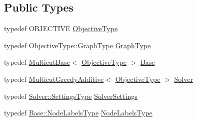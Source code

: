 \subsection*{Public Types}
\begin{DoxyCompactItemize}
\item 
typedef O\+B\+J\+E\+C\+T\+I\+VE \hyperlink{classnifty_1_1graph_1_1opt_1_1multicut_1_1GreedyAdditiveProposals_a8b28464e490d224a3626680692ac2170}{Objective\+Type}
\item 
typedef Objective\+Type\+::\+Graph\+Type \hyperlink{classnifty_1_1graph_1_1opt_1_1multicut_1_1GreedyAdditiveProposals_a059ec39cbdde7294a76dac00d102e209}{Graph\+Type}
\item 
typedef \hyperlink{classnifty_1_1graph_1_1opt_1_1multicut_1_1MulticutBase}{Multicut\+Base}$<$ \hyperlink{classnifty_1_1graph_1_1opt_1_1multicut_1_1GreedyAdditiveProposals_a8b28464e490d224a3626680692ac2170}{Objective\+Type} $>$ \hyperlink{classnifty_1_1graph_1_1opt_1_1multicut_1_1GreedyAdditiveProposals_a058a440d88f840a245fdc792d47611d5}{Base}
\item 
typedef \hyperlink{classnifty_1_1graph_1_1opt_1_1multicut_1_1MulticutGreedyAdditive}{Multicut\+Greedy\+Additive}$<$ \hyperlink{classnifty_1_1graph_1_1opt_1_1multicut_1_1GreedyAdditiveProposals_a8b28464e490d224a3626680692ac2170}{Objective\+Type} $>$ \hyperlink{classnifty_1_1graph_1_1opt_1_1multicut_1_1GreedyAdditiveProposals_a436b21c4ce1d95f27c50cf7aa9b41b1f}{Solver}
\item 
typedef \hyperlink{classnifty_1_1graph_1_1opt_1_1multicut_1_1MulticutGreedyAdditive_a074ee39f5884cff7359f5c0997929e2f}{Solver\+::\+Settings\+Type} \hyperlink{classnifty_1_1graph_1_1opt_1_1multicut_1_1GreedyAdditiveProposals_a7612d756b6f63b2cda337c3d1a0fa4c9}{Solver\+Settings}
\item 
typedef \hyperlink{classnifty_1_1graph_1_1opt_1_1common_1_1SolverBase_abefd51561de2fd009f6bed6bef6009ea}{Base\+::\+Node\+Labels\+Type} \hyperlink{classnifty_1_1graph_1_1opt_1_1multicut_1_1GreedyAdditiveProposals_a4097016ca99d6d2aab8f3a8a9432f001}{Node\+Labels\+Type}
\end{DoxyCompactItemize}
